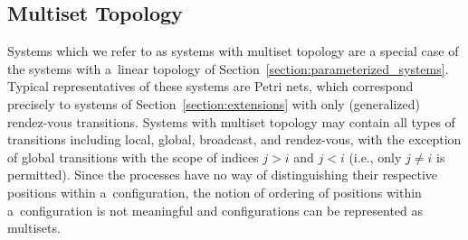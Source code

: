 \subsection{Multiset Topology}
\label{section:multisets}
Systems which we refer to as systems with multiset topology are a
special case of the systems with 
a~linear topology of Section~\ref{section:parameterized_systems}. 
Typical representatives of these systems are Petri nets, which correspond precisely to systems of Section~\ref{section:extensions} with only (generalized) rendez-vous transitions.
Systems with multiset topology may contain all types of transitions
including local, global, broadcast, and rendez-vous, with the
exception of global transitions with the scope of indices
$j>i$ and $j<i$ (i.e., only $j\neq i$ is permitted). 
Since the processes have no way of distinguishing their respective positions within a~configuration,
the notion of ordering of positions within a~configuration is not meaningful and configurations can be represented as multisets. 
